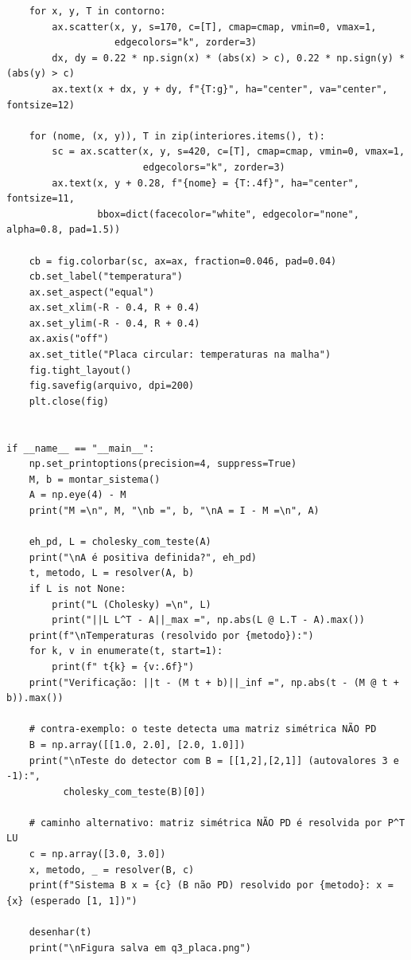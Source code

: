 \documentclass{article}
\theoremstyle{remark}
\begin{document}
\begin{lstlisting}
    for x, y, T in contorno:
        ax.scatter(x, y, s=170, c=[T], cmap=cmap, vmin=0, vmax=1,
                   edgecolors="k", zorder=3)
        dx, dy = 0.22 * np.sign(x) * (abs(x) > c), 0.22 * np.sign(y) * (abs(y) > c)
        ax.text(x + dx, y + dy, f"{T:g}", ha="center", va="center", fontsize=12)

    for (nome, (x, y)), T in zip(interiores.items(), t):
        sc = ax.scatter(x, y, s=420, c=[T], cmap=cmap, vmin=0, vmax=1,
                        edgecolors="k", zorder=3)
        ax.text(x, y + 0.28, f"{nome} = {T:.4f}", ha="center", fontsize=11,
                bbox=dict(facecolor="white", edgecolor="none", alpha=0.8, pad=1.5))

    cb = fig.colorbar(sc, ax=ax, fraction=0.046, pad=0.04)
    cb.set_label("temperatura")
    ax.set_aspect("equal")
    ax.set_xlim(-R - 0.4, R + 0.4)
    ax.set_ylim(-R - 0.4, R + 0.4)
    ax.axis("off")
    ax.set_title("Placa circular: temperaturas na malha")
    fig.tight_layout()
    fig.savefig(arquivo, dpi=200)
    plt.close(fig)


if __name__ == "__main__":
    np.set_printoptions(precision=4, suppress=True)
    M, b = montar_sistema()
    A = np.eye(4) - M
    print("M =\n", M, "\nb =", b, "\nA = I - M =\n", A)

    eh_pd, L = cholesky_com_teste(A)
    print("\nA é positiva definida?", eh_pd)
    t, metodo, L = resolver(A, b)
    if L is not None:
        print("L (Cholesky) =\n", L)
        print("||L L^T - A||_max =", np.abs(L @ L.T - A).max())
    print(f"\nTemperaturas (resolvido por {metodo}):")
    for k, v in enumerate(t, start=1):
        print(f" t{k} = {v:.6f}")
    print("Verificação: ||t - (M t + b)||_inf =", np.abs(t - (M @ t + b)).max())

    # contra-exemplo: o teste detecta uma matriz simétrica NÃO PD
    B = np.array([[1.0, 2.0], [2.0, 1.0]])
    print("\nTeste do detector com B = [[1,2],[2,1]] (autovalores 3 e -1):",
          cholesky_com_teste(B)[0])

    # caminho alternativo: matriz simétrica NÃO PD é resolvida por P^T LU
    c = np.array([3.0, 3.0])
    x, metodo, _ = resolver(B, c)
    print(f"Sistema B x = {c} (B não PD) resolvido por {metodo}: x = {x} (esperado [1, 1])")

    desenhar(t)
    print("\nFigura salva em q3_placa.png")
\end{lstlisting}
\end{document}
